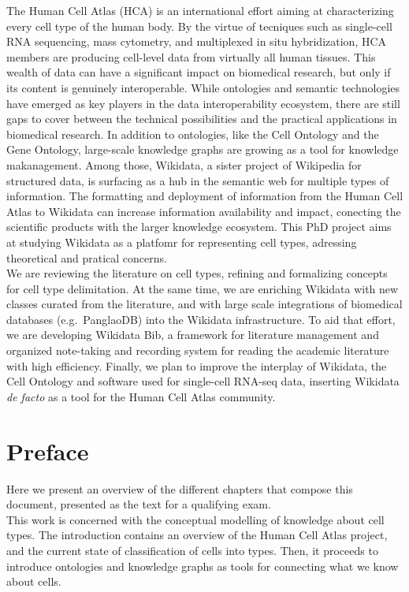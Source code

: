 The Human Cell Atlas (HCA) is an international effort aiming at characterizing every cell type of the human body.
By the virtue of tecniques such as single-cell RNA sequencing, mass cytometry, and multiplexed in situ hybridization, HCA members are producing cell-level data from virtually all human tissues.
This wealth of data can have a significant impact on biomedical research, but only if its content is genuinely interoperable.
While ontologies and semantic technologies have emerged as key players in the data interoperability ecosystem, there are still gaps to cover between the technical possibilities and the practical applications in biomedical research.
In addition to ontologies, like the Cell Ontology and the Gene Ontology, large-scale knowledge graphs are growing as a tool for knowledge makanagement.
Among those, Wikidata, a sister project of Wikipedia for structured data, is surfacing as a hub in the semantic web for multiple types of information.
The formatting and deployment of information from the Human Cell Atlas to Wikidata can increase information availability and impact, conecting the scientific products with the larger knowledge ecosystem.
This PhD project aims at studying Wikidata as a platfomr for representing cell types, adressing theoretical and pratical concerns.\\
We are reviewing the literature on cell types, refining and formalizing concepts for cell type delimitation.
At the same time, we are enriching Wikidata with new classes curated from the literature, and with large scale integrations of biomedical databases (e.g.~PanglaoDB) into the Wikidata infrastructure.
To aid that effort, we are developing Wikidata Bib, a framework for literature management and organized note-taking and recording system for reading the academic literature with high efficiency.
Finally, we plan to improve the interplay of Wikidata, the Cell Ontology and software used for single-cell RNA-seq data, inserting Wikidata \emph{de facto} as a tool for the Human Cell Atlas community.

\hypertarget{preface}{%
\section{Preface}\label{preface}}

Here we present an overview of the different chapters that compose this document, presented as the text for a qualifying exam.\\
This work is concerned with the conceptual modelling of knowledge about cell types.
The introduction contains an overview of the Human Cell Atlas project, and the current state of classification of cells into types.
Then, it proceeds to introduce ontologies and knowledge graphs as tools for connecting what we know about cells.

